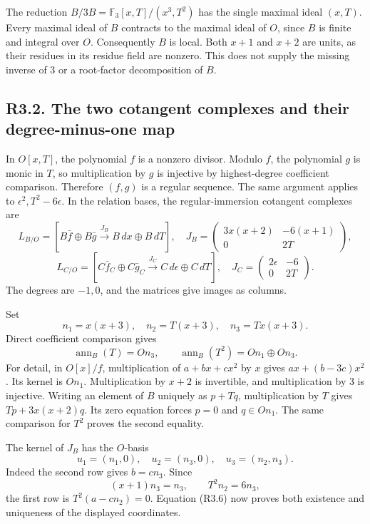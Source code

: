 \documentclass[
]{article}
\begin{document}
The reduction \(B/3B=\mathbb F_3[x,T]/(x^3,T^2)\) has the single maximal
ideal \((x,T)\). Every maximal ideal of \(B\) contracts to the maximal
ideal of \(O\), since \(B\) is finite and integral over \(O\).
Consequently \(B\) is local. Both \(x+1\) and \(x+2\) are units, as
their residues in its residue field are nonzero. This does not supply
the missing inverse of 3 or a root-factor decomposition of \(B\).

\subsection{R3.2. The two cotangent complexes and their degree-minus-one
map}\label{r3.2.-the-two-cotangent-complexes-and-their-degree-minus-one-map}

In \(O[x,T]\), the polynomial \(f\) is a nonzero divisor. Modulo \(f\),
the polynomial \(g\) is monic in \(T\), so multiplication by \(g\) is
injective by highest-degree coefficient comparison. Therefore \((f,g)\)
is a regular sequence. The same argument applies to
\(\epsilon^2,T^2-6\epsilon\). In the relation bases, the
regular-immersion cotangent complexes are \[
L_{B/O}=
\left[B\bar f\oplus B\bar g
\xrightarrow{J_B}B\,dx\oplus B\,dT\right],
\quad
J_B=
\begin{pmatrix}3x(x+2)&-6(x+1)\\0&2T\end{pmatrix},
\] \[
L_{C/O}=
\left[C\bar f_C\oplus C\bar g_C
\xrightarrow{J_C}C\,d\epsilon\oplus C\,dT\right],
\quad
J_C=
\begin{pmatrix}2\epsilon&-6\\0&2T\end{pmatrix}.
\tag{R3.5}
\] The degrees are \(-1,0\), and the matrices give images as columns.

Set \[
n_1=x(x+3),\quad n_2=T(x+3),\quad n_3=Tx(x+3).
\] Direct coefficient comparison gives \[
\operatorname{ann}_B(T)=On_3,\qquad
\operatorname{ann}_B(T^2)=On_1\oplus On_3.
\tag{R3.6}
\] For detail, in \(O[x]/f\), multiplication of \(a+bx+cx^2\) by \(x\)
gives \(ax+(b-3c)x^2\). Its kernel is \(On_1\). Multiplication by
\(x+2\) is invertible, and multiplication by 3 is injective. Writing an
element of \(B\) uniquely as \(p+Tq\), multiplication by \(T\) gives
\(Tp+3x(x+2)q\). Its zero equation forces \(p=0\) and \(q\in On_1\). The
same comparison for \(T^2\) proves the second equality.

The kernel of \(J_B\) has the \(O\)-basis \[
u_1=(n_1,0),\quad u_2=(n_3,0),\quad u_3=(n_2,n_3).
\tag{R3.7}
\] Indeed the second row gives \(b=cn_3\). Since \[
(x+1)n_3=n_3,\qquad T^2n_2=6n_3,
\] the first row is \(T^2(a-cn_2)=0\). Equation (R3.6) now proves both
existence and uniqueness of the displayed coordinates.
\end{document}
